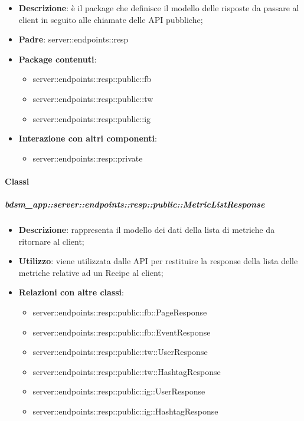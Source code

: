 \begin{itemize}
  \item \textbf{Descrizione}: è il package che definisce il modello delle risposte da passare al client in seguito alle chiamate delle API pubbliche;
  \item \textbf{Padre}: server::endpoints::resp
  \item \textbf{Package contenuti}:
  	\begin{itemize}
  		\item server::endpoints::resp::public::fb
  		\item server::endpoints::resp::public::tw
  		\item server::endpoints::resp::public::ig
	\end{itemize}
  \item \textbf{Interazione con altri componenti}:
  	\begin{itemize}
  		\item server::endpoints::resp::private
	\end{itemize}
\end{itemize}

	\paragraph{Classi} %

    \subparagraph{bdsm\_app::server::endpoints::resp::public::MetricListResponse} %
    \label{subp:bdsm_app_server_endpoints_resp_public_metriclistresponse}
    \begin{itemize}
      \item \textbf{Descrizione}: rappresenta il modello dei dati della lista di metriche da ritornare al client;
      \item \textbf{Utilizzo}: viene utilizzata dalle API per restituire la response della lista delle metriche relative ad un Recipe al client;
      \item \textbf{Relazioni con altre classi}:
        \begin{itemize}
          \item server::endpoints::resp::public::fb::PageResponse
          \item server::endpoints::resp::public::fb::EventResponse
          \item server::endpoints::resp::public::tw::UserResponse
          \item server::endpoints::resp::public::tw::HashtagResponse
          \item server::endpoints::resp::public::ig::UserResponse
          \item server::endpoints::resp::public::ig::HashtagResponse
        \end{itemize}
      \end{itemize}

